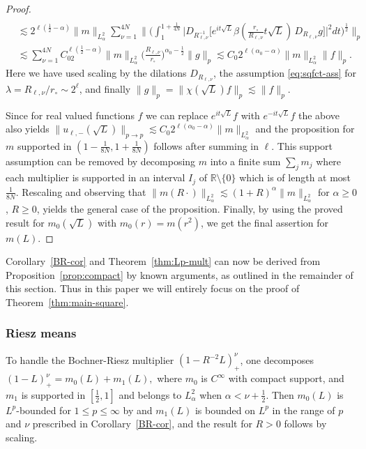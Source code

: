 \documentclass[leqno]{amsart}
\theoremstyle{definition}
\theoremstyle{remark}
\numberwithin{equation}{section}
\newcommand\lc{\lesssim}
\newcommand\la{{\lambda}}
\newcommand\bbR{{\mathbb {R}}}
\begin{document}
\begin{proof}
\begin{align*}
\\
&\lc 2^{\ell (\frac 12-\alpha)} \| m \|_{L^2_ \alpha}  \sum_{\nu=1}^{4N}  
\Big\| \Big(\int_1^{1+\frac{1}{4N} }\big |D_{R_{\ell,\nu}^{-1} }\big[ e^{i t \sqrt {L}}  \beta (\tfrac{r_\circ}{R_{\ell,\nu}} t \sqrt  { L} ) \, D_{R_{\ell,\nu}} g\big]\big |^2  dt \Big)^{\frac 12} \Big\|_p 
\\
&\lc \sum_{\nu=1}^{4N}  C_02^{\ell (\frac 12-\alpha)} \| m \|_{L^2_ \alpha}  \Big( \frac{R_{\ell,\nu}}{r_\circ}\Big) ^{\alpha_0-\frac 12}   \|g\|_p \lc C_0 2^{\ell(\alpha_0-\alpha)} \| m \|_{L^2_ \alpha}  \|f\|_p. 
\end{align*}
Here we have used scaling by the dilations $D_{R_{\ell,\nu}}$, the assumption \eqref{eq:sqfct-ass} for $\la=R_{\ell,\nu} /r_\circ\sim 2^\ell$, and finally $\|g\|_p=\|\chi(\sqrt L) f\|_p\lc \|f\|_p$.

Since for real valued functions $f$ we can replace $e^{i t\sqrt L}f$ with $e^{-it\sqrt L}f$ the  above also yields $\|u_{\ell,-}(\sqrt L) \|_{p\to p} \lc C_0 2^{\ell (\alpha_0-\alpha)} \| m \|_{L^2_ \alpha}$ and the proposition  for $m$ supported in $(1-\frac 1{8N},  1+\frac{1}{8N}) $ follows after summing  in $\ell$. This support assumption can be removed by decomposing $m$ into a finite sum $\sum_{j} m_j$ where each multiplier is supported in an  interval $I_j$ of $\bbR\setminus\{0\}$ which is of length at most $\frac{1}{8N}$. Rescaling and observing that $\|m(R\cdot)\|_{L^2_\alpha}\lc (1+R)^\alpha\|m\|_{L^2_\alpha}$ for $\alpha\ge 0$, $R\ge 0$,  yields the general case of the proposition.  Finally, by using the proved result for $m_0(\sqrt L)$ with $m_0(r)= m(r^2)$, we get the final assertion for $m(L)$. 
\end{proof}

Corollary~\ref{BR-cor} and Theorem~\ref{thm:Lp-mult} can now  be derived  from Proposition~\ref{prop:compact} by known arguments, as outlined in the remainder of this section. Thus in this paper we will entirely focus on the proof of Theorem~\ref{thm:main-square}.

\subsubsection*{Riesz means}\label{onBR} 

To handle the Bochner-Riesz multiplier $(1-R^{-2}L)_+^\nu$, one decomposes $(1-L)_+^\nu= m_0(L)+ m_1(L),$ where $m_0$ is $C^\infty$ with compact support,  and $m_1$ is supported in $[\frac 12, 1]$ 
and 
belongs  to $L^2_\alpha$  when $\alpha< \nu+\frac 12$. Then $m_0(L)$ is $L^p$-bounded for $1\le p\le \infty$ by \cite{Hu84} and 
$m_1(L)$ is bounded on $L^p$ in the range of $p$ and $\nu$ prescribed in Corollary~\ref{BR-cor}, and the result for $R>0$ follows by scaling. 
\end{document}

